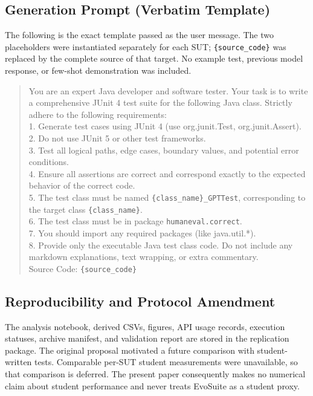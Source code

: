 \subsection{Generation Prompt (Verbatim Template)}
\label{sec:prompt}
The following is the exact template passed as the user message. The two placeholders were instantiated separately for each SUT; \texttt{\{source\_code\}} was replaced by the complete source of that target. No example test, previous model response, or few-shot demonstration was included.

\begin{quote}\footnotesize
You are an expert Java developer and software tester. Your task is to write a comprehensive JUnit 4 test suite for the following Java class. Strictly adhere to the following requirements:\\
1. Generate test cases using JUnit 4 (use org.junit.Test, org.junit.Assert).\\
2. Do not use JUnit 5 or other test frameworks.\\
3. Test all logical paths, edge cases, boundary values, and potential error conditions.\\
4. Ensure all assertions are correct and correspond exactly to the expected behavior of the correct code.\\
5. The test class must be named \texttt{\{class\_name\}\_GPTTest}, corresponding to the target class \texttt{\{class\_name\}}.\\
6. The test class must be in package \texttt{humaneval.correct}.\\
7. You should import any required packages (like java.util.*).\\
8. Provide only the executable Java test class code. Do not include any markdown explanations, text wrapping, or extra commentary.\\
Source Code: \texttt{\{source\_code\}}
\end{quote}

\subsection{Reproducibility and Protocol Amendment}
The analysis notebook, derived CSVs, figures, API usage records, execution statuses, archive manifest, and validation report are stored in the replication package. The original proposal motivated a future comparison with student-written tests. Comparable per-SUT student measurements were unavailable, so that comparison is deferred. The present paper consequently makes no numerical claim about student performance and never treats EvoSuite as a student proxy.
